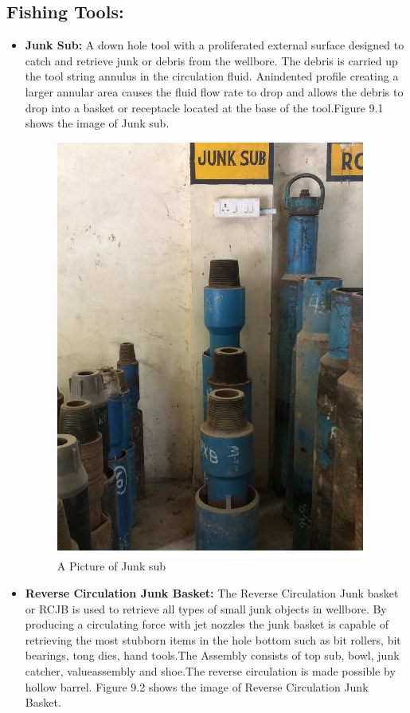 \subsection*{Fishing Tools:}

\begin{itemize}

\item \textbf{Junk Sub:} A down hole tool with a proliferated external surface
designed to catch and retrieve junk or debris from the wellbore. The
debris is carried up the tool string annulus in the circulation fluid. Anindented profile creating a larger annular area causes the fluid flow
rate to drop and allows the debris to drop into a basket or receptacle
located at the base of the tool.Figure 9.1 shows the image of Junk sub.

\begin{figure}[h]
\includegraphics[scale=0.3]{images/junksub}
\centering 
\caption{A Picture of Junk sub}
\end{figure}


\item \textbf{Reverse Circulation Junk Basket:} The Reverse Circulation Junk
basket or RCJB is used to retrieve all types of small junk objects in
wellbore. By producing a circulating force with jet nozzles the junk
basket is capable of retrieving the most stubborn items in the hole
bottom such as bit rollers, bit bearings, tong dies, hand tools.The Assembly consists of top sub,
bowl, junk catcher, valueassembly and shoe.The reverse circulation is made possible by hollow barrel.
Figure 9.2 shows the image of Reverse Circulation Junk Basket.



\end{itemize}
